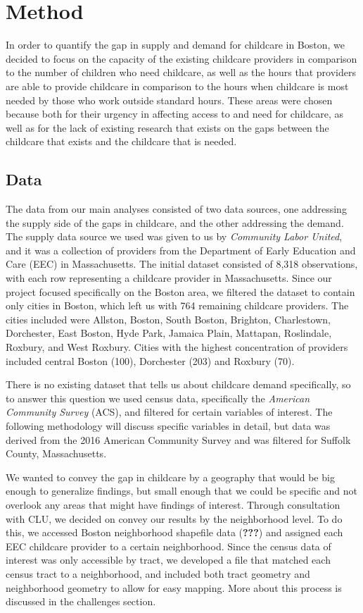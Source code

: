 \documentclass[man]{apa6}
\begin{document}
\section{Method}\label{method}

In order to quantify the gap in supply and demand for childcare in
Boston, we decided to focus on the capacity of the existing childcare
providers in comparison to the number of children who need childcare, as
well as the hours that providers are able to provide childcare in
comparison to the hours when childcare is most needed by those who work
outside standard hours. These areas were chosen because both for their
urgency in affecting access to and need for childcare, as well as for
the lack of existing research that exists on the gaps between the
childcare that exists and the childcare that is needed.

\subsection{Data}\label{data}

The data from our main analyses consisted of two data sources, one
addressing the supply side of the gaps in childcare, and the other
addressing the demand. The supply data source we used was given to us by
\emph{Community Labor United}, and it was a collection of providers from
the Department of Early Education and Care (EEC) in Massachusetts. The
initial dataset consisted of 8,318 observations, with each row
representing a childcare provider in Massachusetts. Since our project
focused specifically on the Boston area, we filtered the dataset to
contain only cities in Boston, which left us with 764 remaining
childcare providers. The cities included were Allston, Boston, South
Boston, Brighton, Charlestown, Dorchester, East Boston, Hyde Park,
Jamaica Plain, Mattapan, Roslindale, Roxbury, and West Roxbury. Cities
with the highest concentration of providers included central Boston
(100), Dorchester (203) and Roxbury (70).

There is no existing dataset that tells us about childcare demand
specifically, so to answer this question we used census data,
specifically the \emph{American Community Survey} (ACS), and filtered
for certain variables of interest. The following methodology will
discuss specific variables in detail, but data was derived from the 2016
American Community Survey and was filtered for Suffolk County,
Massachusetts.

We wanted to convey the gap in childcare by a geography that would be
big enough to generalize findings, but small enough that we could be
specific and not overlook any areas that might have findings of
interest. Through consultation with CLU, we decided on convey our
results by the neighborhood level. To do this, we accessed Boston
neighborhood shapefile data ({\textbf{???}}) and assigned each EEC
childcare provider to a certain neighborhood. Since the census data of
interest was only accessible by tract, we developed a file that matched
each census tract to a neighborhood, and included both tract geometry
and neighborhood geometry to allow for easy mapping. More about this
process is discussed in the challenges section.
\end{document}
